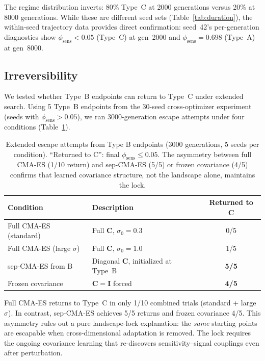 \documentclass[twoside,11pt]{article}
\newcommand{\bC}{\mathbf{C}}
\newcommand{\bI}{\mathbf{I}}
\begin{document}
The regime distribution inverts: 80\% Type~C at 2000 generations versus 20\%
at 8000 generations. While these are different seed sets (Table~\ref{tab:duration}),
the within-seed trajectory data provides direct confirmation: seed~42's
per-generation diagnostics show $\phi_{\text{sens}} < 0.05$ (Type~C) at gen~2000
and $\phi_{\text{sens}} = 0.698$ (Type~A) at gen~8000.

\subsection{Irreversibility}
\label{sec:irreversibility}

We tested whether Type~B endpoints can return to Type~C under extended
search. Using 5 Type~B endpoints from the 30-seed cross-optimizer experiment
(seeds with $\phi_{\text{sens}} > 0.05$), we ran 3000-generation escape
attempts under four conditions (Table~\ref{tab:interventions}).

\begin{table}[t]
\caption{Extended escape attempts from Type B endpoints (3000 generations,
5 seeds per condition). ``Returned to C'': final $\phi_{\text{sens}} \leq 0.05$.
The asymmetry between full CMA-ES (1/10 return) and sep-CMA-ES (5/5) or
frozen covariance (4/5) confirms that learned covariance structure, not
the landscape alone, maintains the lock.}
\label{tab:interventions}
\centering
\begin{tabular}{llc}
\toprule
Condition & Description & Returned to C \\
\midrule
Full CMA-ES (standard) & Full $\bC$, $\sigma_0 = 0.3$ & 0/5 \\
Full CMA-ES (large $\sigma$) & Full $\bC$, $\sigma_0 = 1.0$ & 1/5 \\
sep-CMA-ES from B & Diagonal $\bC$, initialized at Type~B & \textbf{5/5} \\
Frozen covariance & $\bC = \bI$ forced & \textbf{4/5} \\
\bottomrule
\end{tabular}
\end{table}

Full CMA-ES returns to Type~C in only 1/10 combined trials (standard + large
$\sigma$). In contrast, sep-CMA-ES achieves 5/5 returns and frozen covariance
4/5. This asymmetry rules out a pure landscape-lock explanation: the
\emph{same} starting points are escapable when cross-dimensional adaptation
is removed. The lock requires the ongoing covariance learning that
re-discovers sensitivity--signal couplings even after perturbation.
\end{document}

